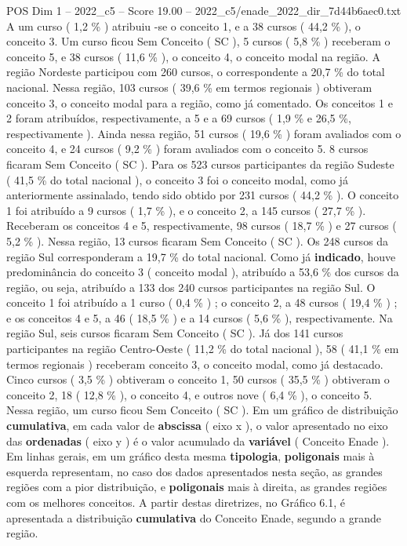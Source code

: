 \begin{textsample}{POS Dim 1 – 2022\_c5 – Score 19.00 – 2022\_c5/enade\_2022\_dir\_7d44b6aec0.txt}
A um curso ( 1,2 \% ) atribuiu -se o conceito 1, e a 38 cursos ( 44,2 \% ), o conceito 3.
Um curso ficou Sem Conceito ( SC ), 5 cursos ( 5,8 \% ) receberam o conceito 5, e 38 cursos ( 11,6 \% ), o conceito 4, o conceito modal na região.
A região Nordeste participou com 260 cursos, o correspondente a 20,7 \% do total nacional.
Nessa região, 103 cursos ( 39,6 \% em termos regionais ) obtiveram conceito 3, o conceito modal para a região, como já comentado.
Os conceitos 1 e 2 foram atribuídos, respectivamente, a 5 e a 69 cursos ( 1,9 \% e 26,5 \%, respectivamente ).
Ainda nessa região, 51 cursos ( 19,6 \% ) foram avaliados com o conceito 4, e 24 cursos ( 9,2 \% ) foram avaliados com o conceito 5. 8 cursos ficaram Sem Conceito ( SC ).
Para os 523 cursos participantes da região Sudeste ( 41,5 \% do total nacional ), o conceito 3 foi o conceito modal, como já anteriormente assinalado, tendo sido obtido por 231 cursos ( 44,2 \% ).
O conceito 1 foi atribuído a 9 cursos ( 1,7 \% ), e o conceito 2, a 145 cursos ( 27,7 \% ).
Receberam os conceitos 4 e 5, respectivamente, 98 cursos ( 18,7 \% ) e 27 cursos ( 5,2 \% ).
Nessa região, 13 cursos ficaram Sem Conceito ( SC ).
Os 248 cursos da região Sul corresponderam a 19,7 \% do total nacional.
Como já \textbf{indicado}, houve predominância do conceito 3 ( conceito modal ), atribuído a 53,6 \% dos cursos da região, ou seja, atribuído a 133 dos 240 cursos participantes na região Sul.
O conceito 1 foi atribuído a 1 curso ( 0,4 \% ) ; o conceito 2, a 48 cursos ( 19,4 \% ) ; e os conceitos 4 e 5, a 46 ( 18,5 \% ) e a 14 cursos ( 5,6 \% ), respectivamente.
Na região Sul, seis cursos ficaram Sem Conceito ( SC ).
Já dos 141 cursos participantes na região Centro-Oeste ( 11,2 \% do total nacional ), 58 ( 41,1 \% em termos regionais ) receberam conceito 3, o conceito modal, como já destacado.
Cinco cursos ( 3,5 \% ) obtiveram o conceito 1, 50 cursos ( 35,5 \% ) obtiveram o conceito 2, 18 ( 12,8 \% ), o conceito 4, e outros nove ( 6,4 \% ), o conceito 5.
Nessa região, um curso ficou Sem Conceito ( SC ).
Em um gráfico de distribuição \textbf{cumulativa}, em cada valor de \textbf{abscissa} ( eixo x ), o valor apresentado no eixo das \textbf{ordenadas} ( eixo y ) é o valor acumulado da \textbf{variável} ( Conceito Enade ).
Em linhas gerais, em um gráfico desta mesma \textbf{tipologia}, \textbf{poligonais} mais à esquerda representam, no caso dos dados apresentados nesta seção, as grandes regiões com a pior distribuição, e \textbf{poligonais} mais à direita, as grandes regiões com os melhores conceitos.
A partir destas diretrizes, no Gráfico 6.1, é apresentada a distribuição \textbf{cumulativa} do Conceito Enade, segundo a grande região.

\end{textsample}
